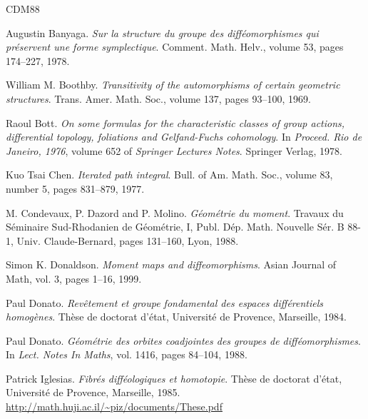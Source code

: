 \documentclass[10pt,reqno,twoside]{amsart}
\theoremstyle{plain}
\theoremstyle{definition}
\begin{document}
  
  \begin{thebibliography}{CDM88}
    
    Augustin Banyaga.
    \newblock \emph{Sur la structure du groupe des diff\'eomorphismes qui pr\'eservent une forme symplectique}.
    \newblock Comment. Math. Helv., volume 53, pages 174--227, 1978.
    
    William M. Boothby.
    \newblock \emph{Transitivity of the automorphisms of certain geometric structures}.
    \newblock Trans. Amer. Math. Soc., volume 137, pages 93--100, 1969.
    
    Raoul Bott.
    \newblock \emph{On some formulas for the characteristic classes of group actions, differential topology, foliations and Gelfand-Fuchs cohomology}.
    \newblock In \emph{Proceed. Rio de Janeiro, 1976}, volume 652 of \emph{Springer Lectures Notes}. Springer Verlag, 1978.
    
    Kuo Tsai Chen.
    \newblock \emph{Iterated path integral}.
    \newblock Bull. of Am. Math. Soc., volume 83, number 5, pages 831--879, 1977.
    
    M. Condevaux, P. Dazord and P. Molino.
    \newblock \emph{G\'eom\'etrie du moment}.
    \newblock Travaux du S\'eminaire Sud-Rhodanien de G\'eom\'etrie, I, Publ. D\'ep. Math. Nouvelle S\'er. B 88-1, Univ. Claude-Bernard, pages 131--160, Lyon, 1988.
    
    Simon K. Donaldson.
    \newblock \emph{Moment maps and diffeomorphisms}.
    \newblock Asian Journal of Math, vol. 3, pages 1--16, 1999.
    
    Paul Donato.
    \newblock \emph{Rev\^etement et groupe fondamental des espaces diff\'e\-rentiels homog\`enes}.
    \newblock Th\`ese de doctorat d'\'etat, Universit\'e de Provence, Marseille, 1984.
    
    Paul Donato.
    \newblock \emph{G\'eom\'etrie des orbites coadjointes des groupes de diff\'eomorphismes}.
    \newblock In \emph{Lect. Notes In Maths}, vol. 1416, pages 84--104, 1988.
    
    Patrick Iglesias.
    \newblock \emph{Fibr\'es diff\'eologiques et homotopie}.
    \newblock Th\`ese de doctorat d'\'e\-tat, Universit\'e de Provence, Marseille, 1985.
    \newblock \url{http://math.huji.ac.il/~piz/documents/These.pdf}
    

\end{thebibliography}
\end{document}

